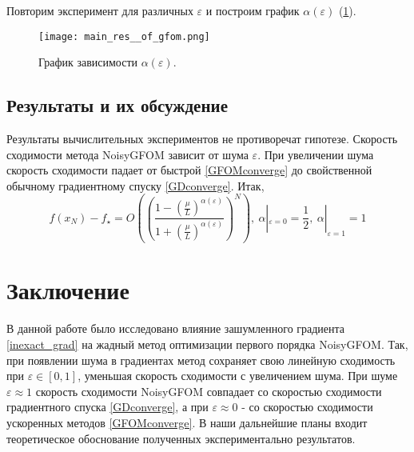 \documentclass{article}
\begin{document}
Повторим эксперимент для различных $\varepsilon$ и построим график $\alpha(\varepsilon)$ (\ref{fig:main_res}).
\begin{figure}[htp]
\centering
\texttt{[image: main\_res\_\_of\_gfom.png]}
    \caption{График зависимости $\alpha(\varepsilon)$.}
    \label{fig:main_res}
\end{figure}

\subsection{Результаты и их обсуждение}

Результаты вычислительных экспериментов не противоречат гипотезе. Скорость сходимости метода NoisyGFOM зависит от шума $\varepsilon$. При увеличении шума скорость сходимости падает от быстрой \eqref{GFOMconverge} до свойственной обычному градиентному спуску \eqref{GDconverge}. Итак, 
\begin{equation}\label{NoisyGFOMconverge}
   f(x_N) - f_{\star} = O\left(\left(\frac{1 - \left(\frac{\mu}{L}\right)^{\alpha(\varepsilon)}}{1 + \left(\frac{\mu}{L}\right)^{\alpha(\varepsilon)}}\right)^N\right),  \
   \alpha|_{\varepsilon = 0} = \frac12, \ \alpha|_{\varepsilon = 1} = 1
\end{equation}

\section{Заключение}
В данной работе было исследовано влияние зашумленного градиента \eqref{inexact_grad} на жадный метод оптимизации первого порядка NoisyGFOM. Так, при появлении шума в градиентах метод сохраняет свою линейную сходимость при $\varepsilon \in [0,1]$, уменьшая скорость сходимости с увеличением шума. При шуме $\varepsilon \approx 1$ скорость сходимости NoisyGFOM совпадает со скоростью сходимости градиентного спуска \eqref{GDconverge}, а при $\varepsilon \approx 0$ - со скоростью сходимости ускоренных методов \eqref{GFOMconverge}.
В наши дальнейшие планы входит теоретическое обоснование полученных экспериментально результатов.
\end{document}

